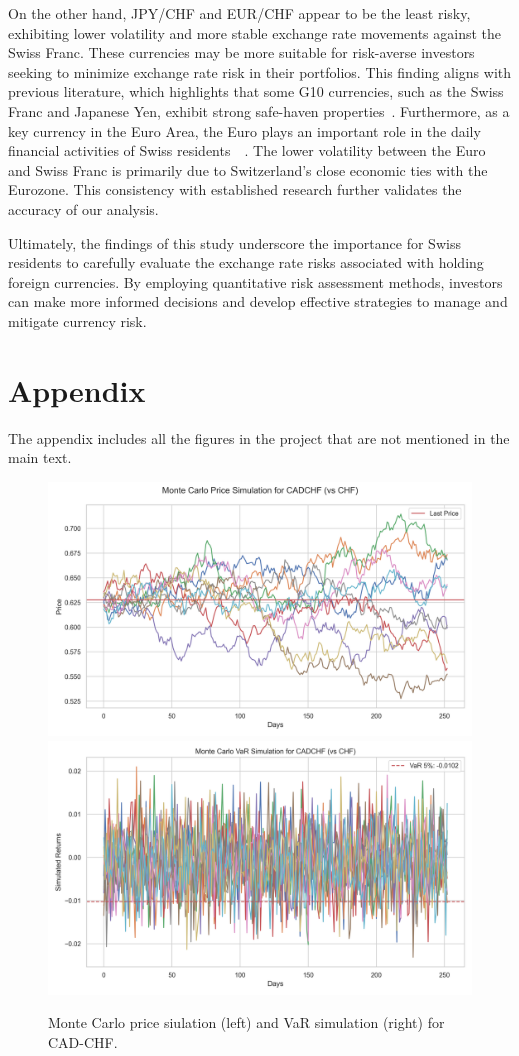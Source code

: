 \documentclass{article}
\begin{document}
On the other hand, JPY/CHF and EUR/CHF appear to be the least risky, exhibiting lower volatility and more stable exchange rate movements against the Swiss Franc. These currencies may be more suitable for risk-averse investors seeking to minimize exchange rate risk in their portfolios. This finding aligns with previous literature, which highlights that some G10 currencies, such as the Swiss Franc and Japanese Yen, exhibit strong safe-haven properties~\cite{ranaldo2010safe}. Furthermore, as a key currency in the Euro Area, the Euro plays an important role in the daily financial activities of Swiss residents~\cite{engel2016exchange}~\cite{goulferni2023switzerland}. The lower volatility between the Euro and Swiss Franc is primarily due to Switzerland's close economic ties with the Eurozone. This consistency with established research further validates the accuracy of our analysis.

Ultimately, the findings of this study underscore the importance for Swiss residents to carefully evaluate the exchange rate risks associated with holding foreign currencies. By employing quantitative risk assessment methods, investors can make more informed decisions and develop effective strategies to manage and mitigate currency risk.


\section*{Appendix}
The appendix includes all the figures in the project that are not mentioned in the main text.

\begin{figure}[H]
    \centering  \includegraphics[width=0.48\linewidth]{reports/figures/monte_carlo_price_simulation_CADCHF_vs_CHF.png} \label{fig:monte_carlo_price_simulation_CADCHF_vs_CHF}
    \includegraphics[width=0.48\linewidth]{reports/figures/monte_carlo_var_simulation_CADCHF_vs_CHF.png} \label{fig:monte_carlo_var_simulation_CADCHF_vs_CHF}
    \caption{\footnotesize Monte Carlo price siulation (left) and VaR simulation (right) for CAD-CHF.}
\end{figure}
\end{document}
